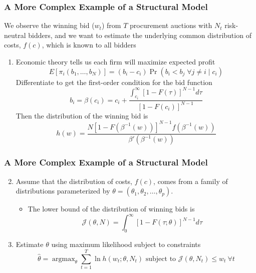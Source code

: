\documentclass{beamer}
\DeclareMathOperator*{\argmax}{argmax}
\begin{document}
\begin{frame}\frametitle{A More Complex Example of a Structural Model}
    We observe the winning bid ($w_t$) from $T$ procurement auctions with $N_t$ risk-neutral bidders, and we want to estimate the underlying common distribution of costs, $f(c)$, which is known to all bidders
    \begin{enumerate}
        \item Economic theory tells us each firm will maximize expected profit
        $$E[\pi_i(b_1, \ldots, b_N)] = (b_i - c_i) \Pr(b_i < b_j \; \forall j \neq i \mid c_i)$$
        Differentiate to get the first-order condition for the bid function
        $$b_i = \beta(c_i) = c_i + \frac{\int_{c_i}^\infty [1 - F(\tau)]^{N - 1} d\tau}{[1 - F(c_i)]^{N - 1}}$$
        Then the distribution of the winning bid is
        $$h(w) = \frac{N [1 - F(\beta^{-1}(w))]^{N-1} f(\beta^{-1}(w))}{\beta'(\beta^{-1}(w))}$$
    \end{enumerate}
\end{frame}

\begin{frame}\frametitle{A More Complex Example of a Structural Model}
    \begin{enumerate}\setcounter{enumi}{1}
    	\item Assume that the distribution of costs, $f(c)$, comes from a family of distributions parameterized by $\theta = (\theta_1, \theta_2, \ldots, \theta_p)$. 
    	\begin{itemize}
    		\item The lower bound of the distribution of winning bids is
    	$$\mathcal{J}(\theta, N) = \int_{0}^\infty [1 - F(\tau; \theta)]^{N - 1} d\tau$$
    	\end{itemize}\item Estimate $\theta$ using maximum likelihood subject to constraints
    	$$\hat{\theta} = \argmax_{\theta} \sum_{t = 1}^T \ln h(w_t; \theta, N_t) \text{ subject to } \mathcal{J}(\theta, N_t) \leq w_t ~ \forall t$$
    \end{enumerate}
\end{frame}
\end{document}
